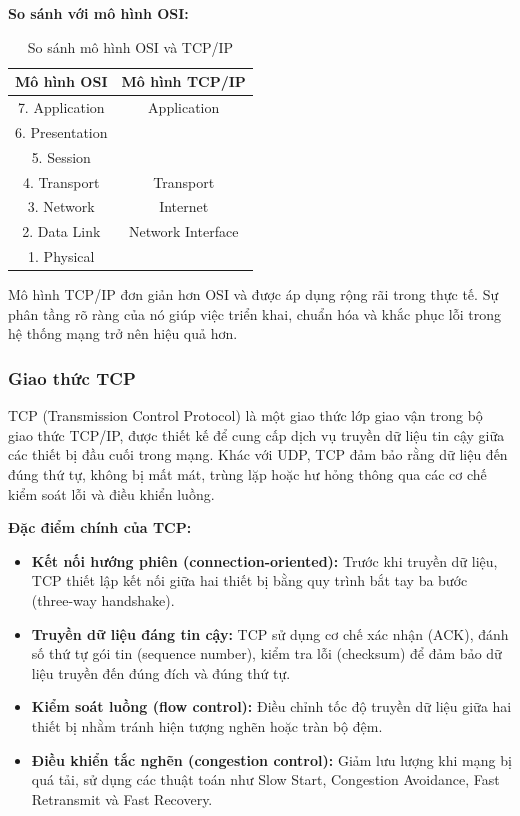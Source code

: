 \textbf{So sánh với mô hình OSI:}

\begin{table}[H]
    \centering
    \caption{So sánh mô hình OSI và TCP/IP}
    \begin{tabular}{|c|c|}
        \hline
        \textbf{Mô hình OSI} & \textbf{Mô hình TCP/IP} \\
        \hline
        7. Application         & Application \\
        6. Presentation        & \\
        5. Session             & \\
        \hline
        4. Transport           & Transport \\
        \hline
        3. Network             & Internet \\
        \hline
        2. Data Link           & Network Interface \\
        1. Physical            & \\
        \hline
    \end{tabular}
\end{table}

Mô hình TCP/IP đơn giản hơn OSI và được áp dụng rộng rãi trong thực tế. Sự phân tầng rõ ràng của nó giúp việc triển khai, chuẩn hóa và khắc phục lỗi trong hệ thống mạng trở nên hiệu quả hơn.

\subsubsection{Giao thức TCP}

TCP\cite{rfc9293} (Transmission Control Protocol) là một giao thức lớp giao vận trong bộ giao thức TCP/IP, được thiết kế để cung cấp dịch vụ truyền dữ liệu tin cậy giữa các thiết bị đầu cuối trong mạng. Khác với UDP, TCP đảm bảo rằng dữ liệu đến đúng thứ tự, không bị mất mát, trùng lặp hoặc hư hỏng thông qua các cơ chế kiểm soát lỗi và điều khiển luồng.

\textbf{Đặc điểm chính của TCP:}
\begin{itemize}
    \item \textbf{Kết nối hướng phiên (connection-oriented):} Trước khi truyền dữ liệu, TCP thiết lập kết nối giữa hai thiết bị bằng quy trình bắt tay ba bước (three-way handshake).
    \item \textbf{Truyền dữ liệu đáng tin cậy:} TCP sử dụng cơ chế xác nhận (ACK), đánh số thứ tự gói tin (sequence number), kiểm tra lỗi (checksum) để đảm bảo dữ liệu truyền đến đúng đích và đúng thứ tự.
    \item \textbf{Kiểm soát luồng (flow control):} Điều chỉnh tốc độ truyền dữ liệu giữa hai thiết bị nhằm tránh hiện tượng nghẽn hoặc tràn bộ đệm.
    \item \textbf{Điều khiển tắc nghẽn (congestion control):} Giảm lưu lượng khi mạng bị quá tải, sử dụng các thuật toán như Slow Start, Congestion Avoidance, Fast Retransmit và Fast Recovery.
\end{itemize}

